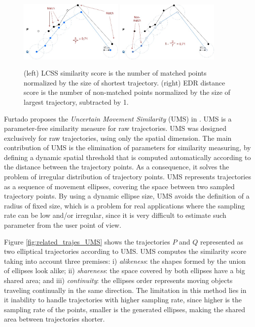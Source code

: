 \begin{figure}[h]
\centering
\includegraphics[width=0.45\textwidth]{Related_Works/related_trajes-LCSS.jpg}
\includegraphics[width=0.45\textwidth]{Related_Works/related_trajes-EDR.jpg}
\caption{\label{fig:related_trajes_EDR_LCSS}(left) LCSS similarity score is the number of matched points normalized by the size of shortest trajectory. (right) EDR distance score is the number of non-matched points normalized by the size of largest trajectory, subtracted by 1.}
\end{figure}

Furtado proposes the \emph{Uncertain Movement Similarity} (UMS) in \cite{Furtado-UMS-2018}. UMS is a parameter-free similarity measure for raw trajectories. UMS was designed exclusively for raw trajectories, using only the spatial dimension. The main contribution of UMS is the elimination of parameters for similarity measuring, by defining a dynamic spatial threshold that is computed automatically according to the distance between the trajectory points. As a consequence, it solves the problem of irregular distribution of trajectory points. UMS represents trajectories as a sequence of movement ellipses, covering the space between two sampled trajectory points.
By using a dynamic ellipse size,  UMS avoids the definition of a radius of fixed size, which is a problem for real applications where the sampling rate can be low and/or irregular, since it is very difficult to estimate such parameter from the user point of view.

Figure \ref{fig:related_trajes_UMS} shows the trajectories $P$ and $Q$ represented as two elliptical trajectories according to UMS. UMS computes the similarity score taking into account three premises: i) \textit{alikeness}: the shapes formed by the union of ellipses look alike; ii) \textit{shareness}: the space covered by both ellipses have a big shared area; and iii) \textit{continuity}: the ellipses order represents moving objects traveling continually in the same direction. The limitation in this method lies in it inability to handle trajectories with higher sampling rate, since higher is the sampling rate of the points, smaller is the generated ellipses, making the shared area between trajectories shorter.

